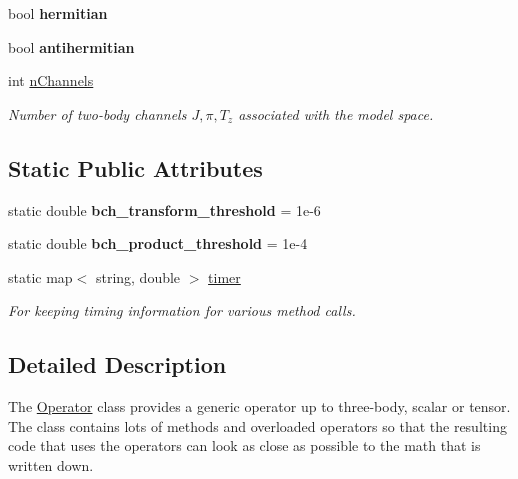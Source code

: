 \begin{DoxyCompactItemize}
\item 
\hypertarget{classOperator_ad46a54204c51cf5c82e4c489217bd2c1}{bool {\bfseries hermitian}}\label{classOperator_ad46a54204c51cf5c82e4c489217bd2c1}

\item 
\hypertarget{classOperator_a86dd30fca215948dd9307fa45b7a2e32}{bool {\bfseries antihermitian}}\label{classOperator_a86dd30fca215948dd9307fa45b7a2e32}

\item 
\hypertarget{classOperator_a710cd3c6107a4497e90a04c1f3d2b15f}{int \hyperlink{classOperator_a710cd3c6107a4497e90a04c1f3d2b15f}{n\-Channels}}\label{classOperator_a710cd3c6107a4497e90a04c1f3d2b15f}

\begin{DoxyCompactList}\small\item\em Number of two-\/body channels $ J,\pi,T_z $ associated with the model space. \end{DoxyCompactList}\end{DoxyCompactItemize}
\subsection*{Static Public Attributes}
\begin{DoxyCompactItemize}
\item 
\hypertarget{classOperator_af4743d3c6e99ebf1915b348447c8e688}{static double {\bfseries bch\-\_\-transform\-\_\-threshold} = 1e-\/6}\label{classOperator_af4743d3c6e99ebf1915b348447c8e688}

\item 
\hypertarget{classOperator_ad4a2ba438f3286ef22cc06b61f745993}{static double {\bfseries bch\-\_\-product\-\_\-threshold} = 1e-\/4}\label{classOperator_ad4a2ba438f3286ef22cc06b61f745993}

\item 
\hypertarget{classOperator_ae3de2afa3ff3dca088122a79404da831}{static map$<$ string, double $>$ \hyperlink{classOperator_ae3de2afa3ff3dca088122a79404da831}{timer}}\label{classOperator_ae3de2afa3ff3dca088122a79404da831}

\begin{DoxyCompactList}\small\item\em For keeping timing information for various method calls. \end{DoxyCompactList}\end{DoxyCompactItemize}


\subsection{Detailed Description}
The \hyperlink{classOperator}{Operator} class provides a generic operator up to three-\/body, scalar or tensor. The class contains lots of methods and overloaded operators so that the resulting code that uses the operators can look as close as possible to the math that is written down. 

